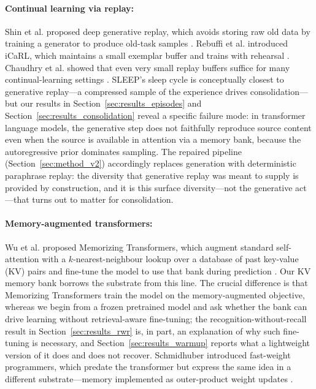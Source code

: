 \paragraph{Continual learning via replay:}
Shin et al. proposed deep generative replay, which avoids storing raw old data by training a generator to produce old-task samples \citep{shin2017continual}. Rebuffi et al. introduced iCaRL, which maintains a small exemplar buffer and trains with rehearsal \citep{rebuffi2017icarl}. Chaudhry et al. showed that even very small replay buffers suffice for many continual-learning settings \citep{chaudhry2019tiny}. SLEEP's sleep cycle is conceptually closest to generative replay---a compressed sample of the experience drives consolidation---but our results in Section~\ref{sec:results_episodes} and Section~\ref{sec:results_consolidation} reveal a specific failure mode: in transformer language models, the generative step does not faithfully reproduce source content even when the source is available in attention via a memory bank, because the autoregressive prior dominates sampling. The repaired pipeline (Section~\ref{sec:method_v2}) accordingly replaces generation with deterministic paraphrase replay: the diversity that generative replay was meant to supply is provided by construction, and it is this surface diversity---not the generative act---that turns out to matter for consolidation.

\paragraph{Memory-augmented transformers:}
Wu et al. proposed Memorizing Transformers, which augment standard self-attention with a $k$-nearest-neighbour lookup over a database of past key-value (KV) pairs and fine-tune the model to use that bank during prediction \citep{wu2022memorizing}. Our KV memory bank borrows the substrate from this line. The crucial difference is that Memorizing Transformers train the model on the memory-augmented objective, whereas we begin from a frozen pretrained model and ask whether the bank can drive learning without retrieval-aware fine-tuning; the recognition-without-recall result in Section~\ref{sec:results_rwr} is, in part, an explanation of why such fine-tuning is necessary, and Section~\ref{sec:results_warmup} reports what a lightweight version of it does and does not recover. Schmidhuber introduced fast-weight programmers, which predate the transformer but express the same idea in a different substrate---memory implemented as outer-product weight updates \citep{schmidhuber1992learning}.

